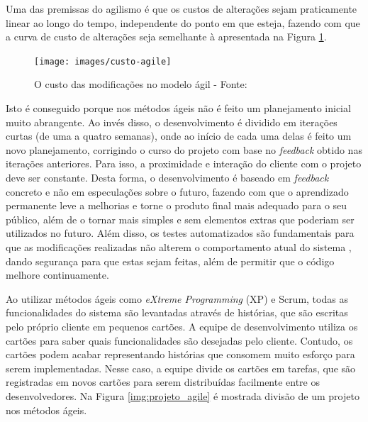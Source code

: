 Uma das premissas do agilismo é que os custos de alterações sejam praticamente linear ao longo do tempo, independente do ponto em que esteja, fazendo com que a curva de custo de alterações seja semelhante à apresentada na Figura \ref{img:custo-agile}.

\begin{figure}[h]
  \center
  \caption{O custo das modificações no modelo ágil - Fonte: \cite{XPKent}}
  \texttt{[image: images/custo-agile]}
  \label{img:custo-agile}
\end{figure}

Isto é conseguido porque nos métodos ágeis não é feito um planejamento inicial muito abrangente. Ao invés disso, o desenvolvimento é dividido em iterações curtas (de uma a quatro semanas), onde ao início de cada uma delas é feito um novo planejamento, corrigindo o curso do projeto com base no \textit{feedback} obtido nas iterações anteriores. Para isso, a proximidade e interação do cliente com o projeto deve ser constante. Desta forma, o desenvolvimento é baseado em \textit{feedback} concreto e não em especulações sobre o futuro, fazendo com que o aprendizado permanente leve a melhorias e torne o produto final mais adequado para o seu público, além de o tornar mais simples e sem elementos extras que poderiam ser utilizados no futuro. Além disso, os testes automatizados são fundamentais para que as modificações realizadas não alterem o comportamento atual do sistema  \cite{XPKent}, dando segurança para que estas sejam feitas, além de permitir que o código melhore continuamente.

Ao utilizar métodos ágeis como \textit{eXtreme Programming} (XP)  e Scrum, todas as funcionalidades do sistema são levantadas através de histórias, que são escritas pelo próprio cliente em pequenos cartões. A equipe de desenvolvimento utiliza os cartões para saber quais funcionalidades são desejadas pelo cliente. Contudo, os cartões podem acabar representando histórias que consomem muito esforço para serem implementadas. Nesse caso, a equipe divide os cartões em tarefas, que são registradas em novos cartões para serem distribuídas facilmente entre os desenvolvedores. Na Figura \ref{img:projeto_agile} é mostrada divisão de um projeto nos métodos ágeis.

